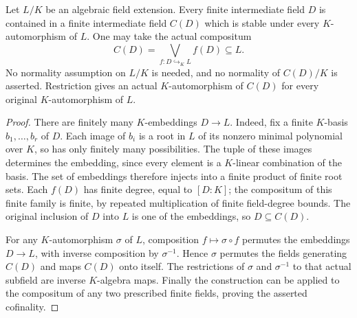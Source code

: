 \begin{lemma}
\label{fw:cofinal-finite-aut-stable-layers}
\leanok
Let $L/K$ be an algebraic field extension. Every finite intermediate
field $D$ is contained in a finite intermediate field $C(D)$ which
is stable under every $K$-automorphism of $L$. One may take the actual
compositum
\[
 C(D)=\bigvee_{f:D\hookrightarrow_K L}f(D)\subseteq L.
\]
No normality assumption on $L/K$ is needed, and no normality of
$C(D)/K$ is asserted. Restriction gives an actual $K$-automorphism
of $C(D)$ for every original $K$-automorphism of $L$.
\end{lemma}
\begin{proof}
There are finitely many $K$-embeddings $D\to L$. Indeed, fix a
finite $K$-basis $b_1,\ldots,b_r$ of $D$. Each image of $b_i$
is a root in $L$ of its nonzero minimal polynomial over $K$,
so has only finitely many possibilities. The tuple of these
images determines the embedding, since every element is a
$K$-linear combination of the basis. The set of embeddings
therefore injects into a finite product of finite root sets.
Each $f(D)$ has finite degree, equal to $[D:K]$; the compositum
of this finite family is finite, by repeated multiplication of
finite field-degree bounds. The original inclusion of $D$ into
$L$ is one of the embeddings, so $D\subseteq C(D)$.

For any $K$-automorphism $\sigma$ of $L$, composition
$f\mapsto\sigma\circ f$ permutes the embeddings $D\to L$,
with inverse composition by $\sigma^{-1}$. Hence $\sigma$
permutes the fields generating $C(D)$ and maps $C(D)$ onto
itself. The restrictions of $\sigma$ and $\sigma^{-1}$ to
that actual subfield are inverse $K$-algebra maps. Finally the
construction can be applied to the compositum of any two
prescribed finite fields, proving the asserted cofinality.
\end{proof}

